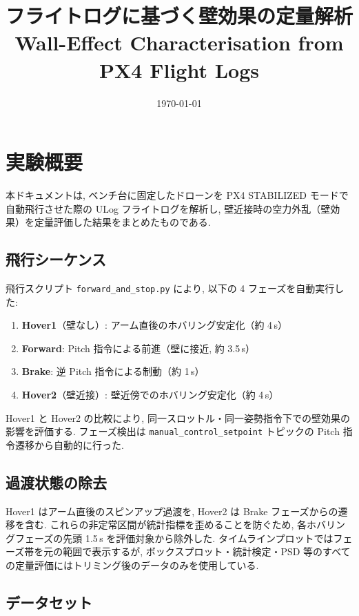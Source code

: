 \documentclass[11pt,a4paper]{ltjsarticle}
\title{\textbf{フライトログに基づく壁効果の定量解析}\\[4pt]
\large Wall-Effect Characterisation from PX4 Flight Logs}
\author{}
\date{\today}
\begin{document}
\maketitle

\section{実験概要}\label{sec:overview}

本ドキュメントは, ベンチ台に固定したドローンを PX4 STABILIZED モードで自動飛行させた際の ULog フライトログを解析し, 壁近接時の空力外乱（壁効果）を定量評価した結果をまとめたものである.

\subsection{飛行シーケンス}

飛行スクリプト \texttt{forward\_and\_stop.py} により, 以下の 4 フェーズを自動実行した:
\begin{enumerate}
    \item \textbf{Hover1}（壁なし）: アーム直後のホバリング安定化（約 4\,s）
    \item \textbf{Forward}: Pitch 指令による前進（壁に接近, 約 3.5\,s）
    \item \textbf{Brake}: 逆 Pitch 指令による制動（約 1\,s）
    \item \textbf{Hover2}（壁近接）: 壁近傍でのホバリング安定化（約 4\,s）
\end{enumerate}

Hover1 と Hover2 の比較により, 同一スロットル・同一姿勢指令下での壁効果の影響を評価する. フェーズ検出は \texttt{manual\_control\_setpoint} トピックの Pitch 指令遷移から自動的に行った.

\subsection{過渡状態の除去}

Hover1 はアーム直後のスピンアップ過渡を, Hover2 は Brake フェーズからの遷移を含む. これらの非定常区間が統計指標を歪めることを防ぐため, 各ホバリングフェーズの先頭 1.5\,s を評価対象から除外した. タイムラインプロットではフェーズ帯を元の範囲で表示するが, ボックスプロット・統計検定・PSD 等のすべての定量評価にはトリミング後のデータのみを使用している.

\subsection{データセット}
\end{document}
